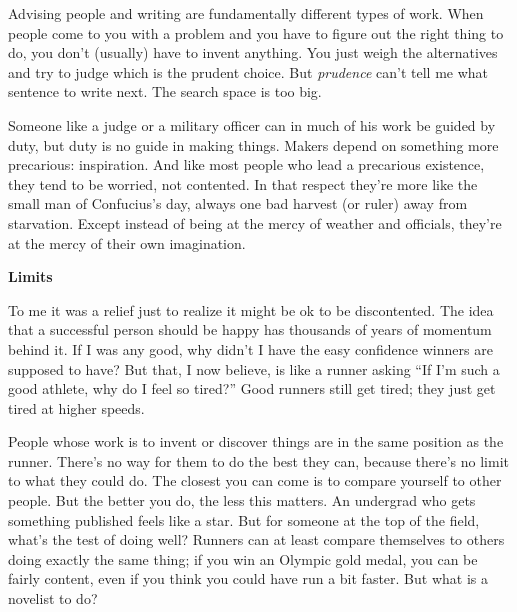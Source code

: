 \documentclass[12pt]{book}
\begin{document}
Advising people and writing are fundamentally different types of work.
When people come to you with a problem and you have to figure out the
right thing to do, you don't (usually) have to invent anything. You just
weigh the alternatives and try to judge which is the prudent choice. But
\emph{prudence} can't tell me what sentence to write next. The search
space is too big.

Someone like a judge or a military officer can in much of his work be
guided by duty, but duty is no guide in making things. Makers depend on
something more precarious: inspiration. And like most people who lead a
precarious existence, they tend to be worried, not contented. In that
respect they're more like the small man of Confucius's day, always one
bad harvest (or ruler) away from starvation. Except instead of being at
the mercy of weather and officials, they're at the mercy of their own
imagination.

\textbf{Limits}

To me it was a relief just to realize it might be ok to be discontented.
The idea that a successful person should be happy has thousands of years
of momentum behind it. If I was any good, why didn't I have the easy
confidence winners are supposed to have? But that, I now believe, is
like a runner asking ``If I'm such a good athlete, why do I feel so
tired?'' Good runners still get tired; they just get tired at higher
speeds.

People whose work is to invent or discover things are in the same
position as the runner. There's no way for them to do the best they can,
because there's no limit to what they could do. The closest you can come
is to compare yourself to other people. But the better you do, the less
this matters. An undergrad who gets something published feels like a
star. But for someone at the top of the field, what's the test of doing
well? Runners can at least compare themselves to others doing exactly
the same thing; if you win an Olympic gold medal, you can be fairly
content, even if you think you could have run a bit faster. But what is
a novelist to do?
\end{document}
